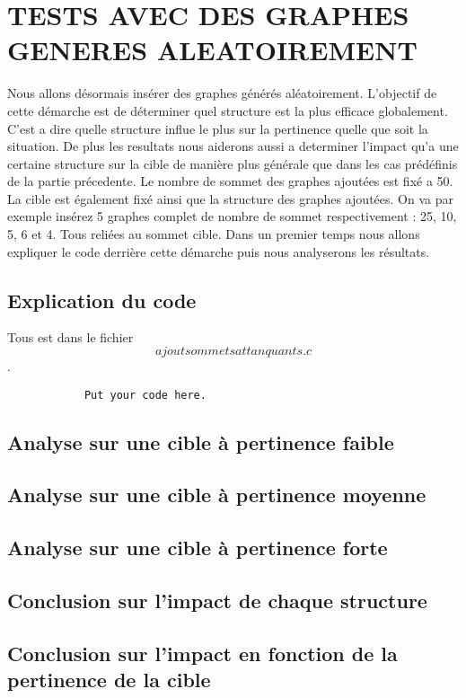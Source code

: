 \documentclass[a4paper,11pt]{article}
\begin{document}
\section{TESTS AVEC DES GRAPHES GENERES ALEATOIREMENT}
	Nous allons désormais insérer des graphes générés aléatoirement.
	L'objectif de cette démarche est de déterminer quel structure est la plus efficace globalement.
	C'est a dire quelle structure influe le plus sur la pertinence quelle que soit la situation.
	De plus les resultats nous aiderons aussi a determiner l'impact qu'a une certaine structure sur la cible de manière plus générale 
	que dans les cas prédéfinis de la partie précedente.
	Le nombre de sommet des graphes ajoutées est fixé a 50.
	La cible est également fixé ainsi que la structure des graphes ajoutées.
	On va par exemple insérez 5 graphes complet de nombre de sommet respectivement : 25, 10, 5, 6 et 4. Tous reliées au sommet cible.
	Dans un premier temps nous allons expliquer le code derrière cette démarche puis nous analyserons les résultats.
	\subsection{Explication du code}
		Tous est dans le fichier $$ajoutsommetsattanquants.c$$.
		\begin{lstlisting}
			Put your code here.
		\end{lstlisting}
	\subsection{Analyse sur une cible à pertinence faible}
	\subsection{Analyse sur une cible à pertinence moyenne}
	\subsection{Analyse sur une cible à pertinence forte}
	\subsection{Conclusion sur l'impact de chaque structure}
	\subsection{Conclusion sur l'impact en fonction de la pertinence de la cible}
\end{document}
